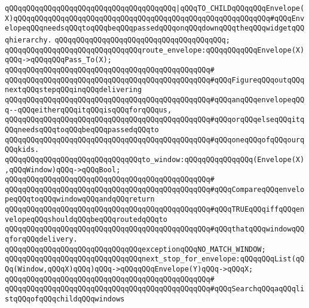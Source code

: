 \verb|qQQqqQQqqQQqqQQqqQQqqQQqqQQqqQQqqQQqqQQq|\verb#|qQQqTO_CHILDqQQqqQQqEnvelope(X)qQQqqQQqqQQqqQQqqQQqqQQqqQQqqQQqqQQqqQQqqQQqqQQqqQQqqQQqqQQq#\verb|#qQQqEnvelopeqQQqneedsqQQqtoqQQqbeqQQqpassedqQQqonqQQqdownqQQqtheqQQqwidgetqQQqhierarchy.|\newline
\verb|qQQqqQQqqQQqqQQqqQQqqQQqqQQqqQQqqQQqqQQq;|\newline
\newline
\verb|qQQqqQQqqQQqqQQqqQQqqQQqqQQqqQQqroute_envelope:qQQqqQQqqQQqEnvelope(X)qQQq->qQQqqQQqPass_To(X);|\newline
\verb|qQQqqQQqqQQqqQQqqQQqqQQqqQQqqQQqqQQqqQQqqQQqqQQq#|\newline
\verb|qQQqqQQqqQQqqQQqqQQqqQQqqQQqqQQqqQQqqQQqqQQqqQQq#qQQqFigureqQQqoutqQQqnextqQQqstepqQQqinqQQqdelivering|\newline
\verb|qQQqqQQqqQQqqQQqqQQqqQQqqQQqqQQqqQQqqQQqqQQqqQQq#qQQqanqQQqenvelopeqQQq--qQQqeitherqQQqitqQQqisqQQqforqQQqus,|\newline
\verb|qQQqqQQqqQQqqQQqqQQqqQQqqQQqqQQqqQQqqQQqqQQqqQQq#qQQqorqQQqelseqQQqitqQQqneedsqQQqtoqQQqbeqQQqpassedqQQqto|\newline
\verb|qQQqqQQqqQQqqQQqqQQqqQQqqQQqqQQqqQQqqQQqqQQqqQQq#qQQqoneqQQqofqQQqourqQQqkids.|\newline
\newline
\verb|qQQqqQQqqQQqqQQqqQQqqQQqqQQqqQQqto_window:qQQqqQQqqQQqqQQq(Envelope(X),qQQqWindow)qQQq->qQQqBool;|\newline
\verb|qQQqqQQqqQQqqQQqqQQqqQQqqQQqqQQqqQQqqQQqqQQqqQQq#|\newline
\verb|qQQqqQQqqQQqqQQqqQQqqQQqqQQqqQQqqQQqqQQqqQQqqQQq#qQQqCompareqQQqenvelopeqQQqtoqQQqwindowqQQqandqQQqreturn|\newline
\verb|qQQqqQQqqQQqqQQqqQQqqQQqqQQqqQQqqQQqqQQqqQQqqQQq#qQQqTRUEqQQqiffqQQqenvelopeqQQqshouldqQQqbeqQQqroutedqQQqto|\newline
\verb|qQQqqQQqqQQqqQQqqQQqqQQqqQQqqQQqqQQqqQQqqQQqqQQq#qQQqthatqQQqwindowqQQqforqQQqdelivery.|\newline
\newline
\verb|qQQqqQQqqQQqqQQqqQQqqQQqqQQqqQQqexceptionqQQqNO_MATCH_WINDOW;|\newline
\newline
\verb|qQQqqQQqqQQqqQQqqQQqqQQqqQQqqQQqnext_stop_for_envelope:qQQqqQQqList(qQQq(Window,qQQqX)qQQq)qQQq->qQQqqQQqEnvelope(Y)qQQq->qQQqX;|\newline
\verb|qQQqqQQqqQQqqQQqqQQqqQQqqQQqqQQqqQQqqQQqqQQqqQQq#|\newline
\verb|qQQqqQQqqQQqqQQqqQQqqQQqqQQqqQQqqQQqqQQqqQQqqQQq#qQQqSearchqQQqaqQQqlistqQQqofqQQqchildqQQqwindows|\newline
